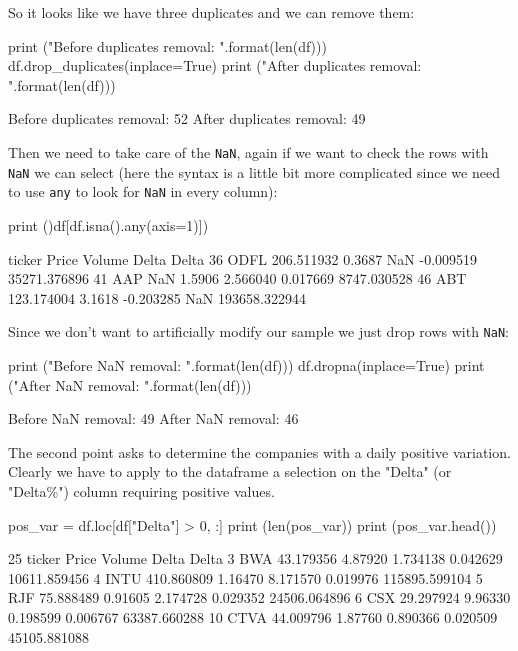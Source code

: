 \begin{solution}
So it looks like we have three duplicates and we can remove them:

\begin{ipython}
print ("Before duplicates removal: {}".format(len(df)))
df.drop_duplicates(inplace=True)
print ("After duplicates removal: {}".format(len(df)))
\end{ipython}
\begin{ioutput}
Before duplicates removal: 52
After duplicates removal: 49
\end{ioutput}

Then we need to take care of the \texttt{NaN}, again if we want to check the rows with \texttt{NaN} we can select (here the syntax is a little bit more complicated since we need to use \texttt{any} to look for \texttt{NaN} in every column):

\begin{ipython}
print ()df[df.isna().any(axis=1)])
\end{ipython}
\begin{ioutput}
   ticker       Price  Volume     Delta    Delta%
36   ODFL  206.511932  0.3687       NaN -0.009519   35271.376896
41    AAP         NaN  1.5906  2.566040  0.017669    8747.030528
46    ABT  123.174004  3.1618 -0.203285       NaN  193658.322944
\end{ioutput}
        
Since we don't want to artificially modify our sample we just drop rows with \texttt{NaN}:

\begin{ipython}
print ("Before NaN removal: {}".format(len(df)))
df.dropna(inplace=True)
print ("After NaN removal: {}".format(len(df)))
\end{ipython}
\begin{ioutput}
Before NaN removal: 49
After NaN removal: 46
\end{ioutput}

The second point asks to determine the companies with a daily positive variation. Clearly we have to apply to the dataframe a selection on the "Delta" (or "Delta\%") column requiring positive values.

\begin{ipython}
pos_var = df.loc[df["Delta"] > 0, :]
print (len(pos_var))
print (pos_var.head())
\end{ipython}
\begin{ioutput}
25
   ticker       Price   Volume     Delta    Delta%
3     BWA   43.179356  4.87920  1.734138  0.042629   10611.859456
4    INTU  410.860809  1.16470  8.171570  0.019976  115895.599104
5     RJF   75.888489  0.91605  2.174728  0.029352   24506.064896
6     CSX   29.297924  9.96330  0.198599  0.006767   63387.660288
10   CTVA   44.009796  1.87760  0.890366  0.020509   45105.881088
\end{ioutput}
        

\end{solution}
